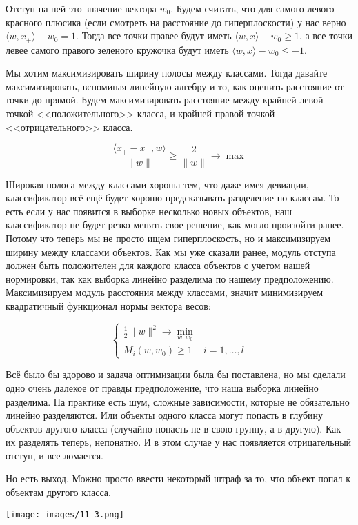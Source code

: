 Отступ на ней это значение вектора $w_0$. Будем считать, что для самого левого красного плюсика (если смотреть на расстояние до гиперплоскости) у нас верно $\langle w, x_+ \rangle - w_0 = 1$. Тогда все точки правее будут иметь $\langle w, x \rangle - w_0 \geqslant 1$, а все точки левее самого правого зеленого кружочка будут
иметь $\langle w, x \rangle - w_0 \leqslant -1$. 

Мы хотим максимизировать ширину полосы между классами. Тогда давайте максимизировать, вспоминая линейную алгебру и то, как оценить расстояние от точки до прямой. Будем максимизировать расстояние между крайней левой точкой <<положительного>> класса, и крайней правой точкой <<отрицательного>> класса.

$$\frac{\langle x_+ - x_-, w \rangle}{\|w\|} \geqslant \frac{2}{\|w\|} \to \max$$

Широкая полоса между классами хороша тем, что даже имея девиации, классификатор всё ещё будет хорошо предсказывать разделение по классам. То есть если у нас появится в выборке несколько новых объектов, наш классификатор не будет резко менять свое решение, как могло произойти ранее. Потому что теперь мы не просто ищем гиперплоскость, но и максимизируем ширину между классами объектов.
Как мы уже сказали ранее, модуль отступа должен быть положителен для каждого класса объектов с учетом нашей нормировки, так как выборка линейно разделима по нашему предположению. Максимизируем модуль расстояния между классами, значит минимизируем квадратичный функционал нормы вектора весов:

$$ \begin{cases}
   \frac{1}{2}\|w\|^2 \to \min\limits_{w, w_0}\\
   M_i(w, w_0) \geqslant 1 & i = 1, \dots, l
 \end{cases}$$

Всё было бы здорово и задача оптимизации была бы поставлена, но мы сделали одно очень далекое от правды предположение, что наша выборка линейно разделима. На практике есть шум, сложные зависимости, которые не обязательно линейно разделяются. Или объекты одного класса могут попасть в глубину объектов другого класса (случайно попасть не в свою группу, а в другую). Как их разделять теперь, непонятно. И в этом случае у нас появляется отрицательный отступ, и все ломается.

Но есть выход. Можно просто ввести некоторый штраф за то, что объект попал к объектам другого класса.\\

\begin{center}
    \texttt{[image: images/11\_3.png]}
\end{center}

